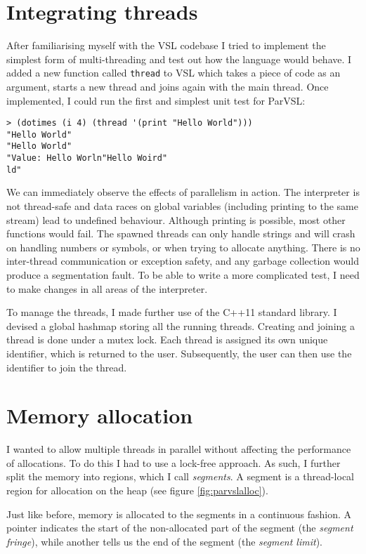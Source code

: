 \section{Integrating threads}
\label{sec:babythreads}
After familiarising myself with the VSL codebase I tried to implement the simplest form of
multi-threading and test out how the language would behave. I added a new function called \verb|thread|
to VSL which takes a piece of code as an argument, starts a new thread and joins again with
the main thread. Once implemented, I could run the first and simplest unit test for ParVSL:

\begin{verbatim}
> (dotimes (i 4) (thread '(print "Hello World")))
"Hello World"
"Hello World"
"Value: Hello Worln"Hello Woird"
ld"
\end{verbatim}

We can immediately observe the effects of parallelism in action. The interpreter is not thread-safe and data races
on global variables (including printing to the same stream) lead to undefined behaviour. Although printing
is possible, most other functions would fail. The spawned threads can only handle strings
and will crash on handling numbers or symbols, or when trying to allocate anything.
There is no inter-thread communication or exception safety, and any garbage collection would produce a segmentation
fault. To be able to write a more complicated test, I need to make changes in all areas of the interpreter.

To manage the threads, I made further use of the C++11 standard library. I devised a global hashmap storing
all the running threads. Creating and joining a thread is done under a mutex lock. Each thread is assigned its own unique
identifier, which is returned to the user. Subsequently, the user can then use the identifier to join the thread.

\section{Memory allocation}
\label{sec:malloc}
\label{sec:storage}

I wanted to allow multiple threads in parallel without affecting the performance
of allocations. To do this I had to use a lock-free approach. As such, I further
split the memory into regions, which I call \emph{segments}. A segment is a thread-local region
for allocation on the heap (see figure \ref{fig:parvslalloc}).

Just like before, memory is allocated to the segments in a continuous
fashion. A pointer indicates the start of the non-allocated part of the segment
(the \emph{segment fringe}), while another tells us the end of the segment
(the \emph{segment limit}).

